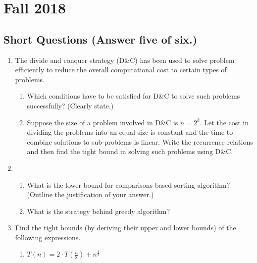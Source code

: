 \section{Fall 2018}

\subsection{Short Questions (Answer five of six.)}

\begin{enumerate}
	\item The divide and conquer strategy (D\&C) has been used to solve problem efficiently to reduce the overall computational cost to certain types of problems.
	\begin{enumerate}[label=\alph*.]
		\item Which conditions have to be satisfied for D\&C to solve such problems successfully?  (Clearly state.)
		\item Suppose the size of a problem involved in D\&C is $n=2^k$.  Let the cost in dividing the problems into an equal size is constant and the time to combine solutions to sub-problems is linear.  Write the recurrence relations and then find the tight bound in solving such problems using D\&C.  
	\end{enumerate}
	
	
	\item \begin{enumerate}[label=\alph*.]
		\item What is the lower bound for comparisons based sorting algorithm? (Outline the justification of your answer.)
		\item What is the strategy behind greedy algorithm?
	\end{enumerate}
	
	
	\item Find the tight bounds (by deriving their upper and lower bounds) of the following expressions.
	\begin{enumerate}[label=\alph*.]
		\item $\displaystyle T(n) = 2 \cdot T \left( \frac{n}{8} \right) + n^{\frac{1}{3}}$
		

\end{enumerate}
\end{enumerate}

